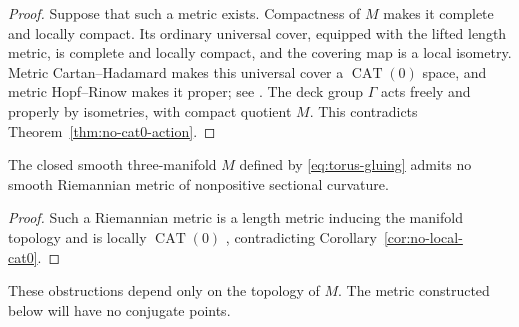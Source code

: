 \begin{proof}
Suppose that such a metric exists.  Compactness of $M$ makes it complete
and locally compact.  Its ordinary universal cover, equipped with the
lifted length metric, is complete and locally compact, and the covering
map is a local isometry.  Metric Cartan--Hadamard makes this universal
cover a $\operatorname{CAT}(0)$ space, and metric Hopf--Rinow makes it
proper; see \cite[Proposition~I.3.7(1) and Theorem~II.4.1(2)]{BridsonHaefliger1999}.
The deck group $\Gamma$ acts freely and properly by isometries, with
compact quotient $M$.  This contradicts Theorem~\ref{thm:no-cat0-action}.
\end{proof}

\begin{proposition}\label{prop:no-npc}
The closed smooth three-manifold $M$ defined by
\eqref{eq:torus-gluing} admits no smooth Riemannian metric of nonpositive
sectional curvature.
\end{proposition}

\begin{proof}
Such a Riemannian metric is a length metric inducing the manifold topology
and is locally $\operatorname{CAT}(0)$
\cite[Theorem~II.1A.6]{BridsonHaefliger1999}, contradicting
Corollary~\ref{cor:no-local-cat0}.
\end{proof}

These obstructions depend only on the topology of $M$.  The metric
constructed below will have no conjugate points.
